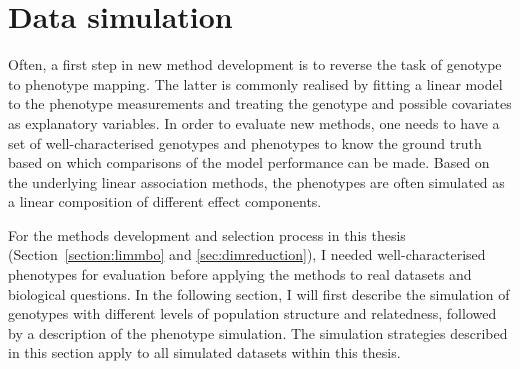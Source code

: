 \section{Data simulation}
\label{section:simulation} 
Often, a first step in new method development is to reverse the task of genotype to phenotype mapping. The latter is commonly realised by fitting a linear model to the phenotype measurements and treating the genotype and possible covariates as explanatory variables. In order to evaluate new methods, one needs to have a set of well-characterised genotypes and phenotypes to know the ground truth based on which comparisons of the model performance can be made. Based on the underlying linear association methods, the phenotypes are often simulated as a linear composition of different effect components. 

For the methods development and selection process in this thesis (Section~\ref{section:limmbo} and \ref{sec:dimreduction}), I needed well-characterised phenotypes for evaluation before applying the methods to real datasets and biological questions. In the following section, I will first describe the simulation of genotypes with different levels of population structure and relatedness, followed by a description of the phenotype simulation. The simulation strategies described in this section apply to all simulated datasets within this thesis. 

